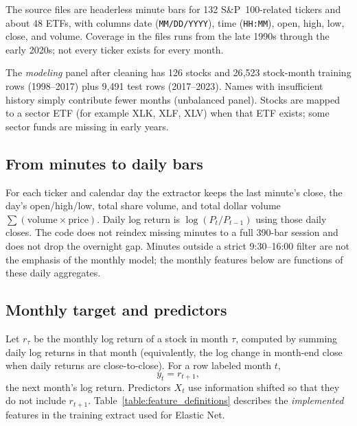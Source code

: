 \documentclass[11pt,twocolumn]{article}
\begin{document}
The source files are headerless minute bars for 132 S\&P~100-related tickers and about 48 ETFs, with columns date (\texttt{MM/DD/YYYY}), time (\texttt{HH:MM}), open, high, low, close, and volume. Coverage in the files runs from the late 1990s through the early 2020s; not every ticker exists for every month.

The \emph{modeling} panel after cleaning has 126 stocks and 26{,}523 stock-month training rows (1998--2017) plus 9{,}491 test rows (2017--2023). Names with insufficient history simply contribute fewer months (unbalanced panel). Stocks are mapped to a sector ETF (for example XLK, XLF, XLV) when that ETF exists; some sector funds are missing in early years.

\subsection{From minutes to daily bars}

For each ticker and calendar day the extractor keeps the last minute's close, the day's open/high/low, total share volume, and total dollar volume $\sum(\mathrm{volume}\times\mathrm{price})$. Daily log return is $\log(P_t/P_{t-1})$ using those daily closes. The code does not reindex missing minutes to a full 390-bar session and does not drop the overnight gap. Minutes outside a strict 9:30--16:00 filter are not the emphasis of the monthly model; the monthly features below are functions of these daily aggregates.

\subsection{Monthly target and predictors}

Let $r_{\tau}$ be the monthly log return of a stock in month $\tau$, computed by summing daily log returns in that month (equivalently, the log change in month-end close when daily returns are close-to-close). For a row labeled month $t$,
\[
y_t = r_{t+1},
\]
the next month's log return. Predictors $X_t$ use information shifted so that they do not include $r_{t+1}$. Table~\ref{table:feature_definitions} describes the \emph{implemented} features in the training extract used for Elastic Net.
\end{document}
